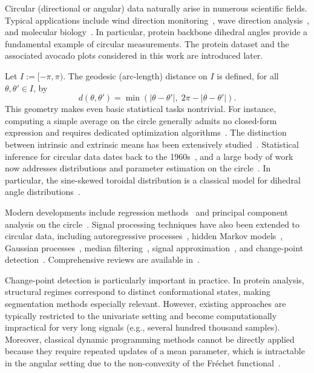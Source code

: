 \documentclass[12pt]{article}
\begin{document}
Circular (directional or angular) data naturally arise in numerous scientific fields. 
Typical applications include wind direction monitoring~\cite{Harvey2023}, wave direction analysis~\cite{Jona-Lasinio2012}, and molecular biology~\cite{Sowa2005}. 
In particular, protein backbone dihedral angles provide a fundamental example of circular measurements. 
The protein dataset and the associated avocado plots considered in this work are introduced later.

Let $I := [-\pi,\pi)$. 
The geodesic (arc-length) distance on $I$ is defined, for all $\theta,\theta' \in I$, by
\begin{equation*}
    d(\theta,\theta') 
    = \min\left( |\theta-\theta'|,\; 2\pi - |\theta-\theta'| \right).
\end{equation*}
This geometry makes even basic statistical tasks nontrivial. 
For instance, computing a simple average on the circle generally admits no closed-form expression and requires dedicated optimization algorithms~\cite{Hotz2015, Arnaudon2016, Cazals2021, McKilliam2012}. 
The distinction between intrinsic and extrinsic means has been extensively studied~\cite{Hotz2013,McKilliam2012}. 
Statistical inference for circular data dates back to the 1960s~\cite{Watson1966,Watson1967}, and a large body of work now addresses distributions and parameter estimation on the circle~\cite{Coeurjolly2012,Ameijeiras-Alonso2022,Jona-Lasinio2012}. 
In particular, the sine-skewed toroidal distribution is a classical model for dihedral angle distributions~\cite{Ameijeiras-Alonso2022}.

Modern developments include regression methods~\cite{Nguyen2023} and principal component analysis on the circle~\cite{Garca-Portugus2023}. 
Signal processing techniques have also been extended to circular data, including autoregressive processes~\cite{Fisher1994,Fisher1983,Harvey2023}, hidden Markov models~\cite{Holzmann2006,Beh2014,Lagona2015,Lagona2025}, Gaussian processes~\cite{Jona-Lasinio2012}, median filtering~\cite{Storath2018}, signal approximation~\cite{Condat2022}, and change-point detection~\cite{Seifert2013,Storath2017}. 
Comprehensive reviews are available in~\cite{Lee2010,Pewsey2021}.

Change-point detection is particularly important in practice. 
In protein analysis, structural regimes correspond to distinct conformational states, making segmentation methods especially relevant. 
However, existing approaches are typically restricted to the univariate setting and become computationally impractical for very long signals (e.g., several hundred thousand samples). 
Moreover, classical dynamic programming methods cannot be directly applied because they require repeated updates of a mean parameter, which is intractable in the angular setting due to the non-convexity of the Fréchet functional~\cite{McKilliam2012,Cazals2021}.
\end{document}
